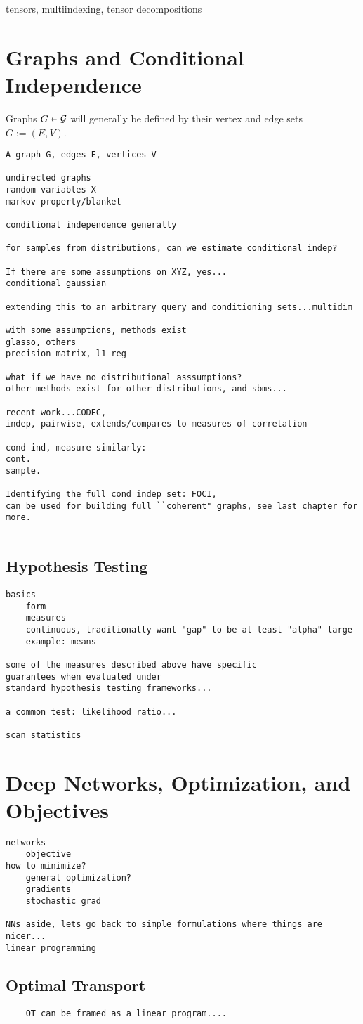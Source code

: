 tensors, multiindexing, tensor decompositions

\section{Graphs and Conditional Independence}

Graphs $G \in \mathcal{G}$ will generally be defined by their vertex and edge sets $G:=(E,V)$.

\begin{verbatim}
A graph G, edges E, vertices V

undirected graphs
random variables X
markov property/blanket

conditional independence generally

for samples from distributions, can we estimate conditional indep?

If there are some assumptions on XYZ, yes...
conditional gaussian

extending this to an arbitrary query and conditioning sets...multidim

with some assumptions, methods exist
glasso, others
precision matrix, l1 reg

what if we have no distributional asssumptions?
other methods exist for other distributions, and sbms...

recent work...CODEC, 
indep, pairwise, extends/compares to measures of correlation

cond ind, measure similarly:
cont.
sample.

Identifying the full cond indep set: FOCI, 
can be used for building full ``coherent" graphs, see last chapter for more.
    
\end{verbatim}

\subsection{Hypothesis Testing}
\begin{verbatim}
basics
    form
    measures
    continuous, traditionally want "gap" to be at least "alpha" large
    example: means

some of the measures described above have specific 
guarantees when evaluated under
standard hypothesis testing frameworks...

a common test: likelihood ratio...

scan statistics
\end{verbatim}

\section{Deep Networks, Optimization, and Objectives}
\begin{verbatim}
networks
    objective
how to minimize?
    general optimization?
    gradients
    stochastic grad

NNs aside, lets go back to simple formulations where things are nicer...
linear programming
\end{verbatim}

\subsection{Optimal Transport}
\begin{verbatim}
    OT can be framed as a linear program....
\end{verbatim}
    
